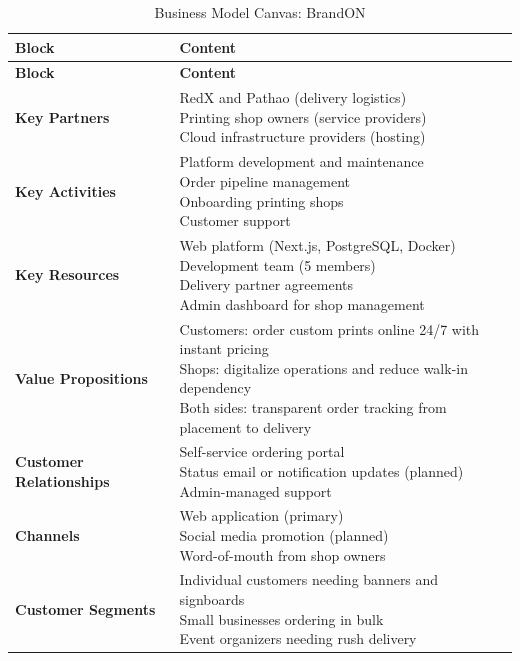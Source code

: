 \documentclass[12pt,a4paper]{report}
\makeatletter
\newcommand{\celllines}[1]{\begin{tabular}[t]{@{}l@{}}#1\end{tabular}}
\makeatother
\begin{document}
\begingroup
\footnotesize
\setlength{\LTleft}{0pt}
\setlength{\LTright}{0pt}
\setlength{\tabcolsep}{3pt}
\renewcommand{\arraystretch}{1.0}
\begin{xltabular}{\textwidth}{@{}L{3.2cm} X@{}}
  \caption{Business Model Canvas: BrandON}\\
  \toprule
  \textbf{Block} & \textbf{Content} \\
  \midrule
  \endfirsthead
  \toprule
  \textbf{Block} & \textbf{Content} \\
  \midrule
  \endhead
  \bottomrule
  \endfoot
  \textbf{Key Partners}
    & \celllines{RedX and Pathao (delivery logistics)\\Printing shop owners (service providers)\\Cloud infrastructure providers (hosting)} \\
  \midrule
  \textbf{Key Activities}
    & \celllines{Platform development and maintenance\\Order pipeline management\\Onboarding printing shops\\Customer support} \\
  \midrule
  \textbf{Key Resources}
    & \celllines{Web platform (Next.js, PostgreSQL, Docker)\\Development team (5 members)\\Delivery partner agreements\\Admin dashboard for shop management} \\
  \midrule
  \textbf{Value Propositions}
    & \celllines{Customers: order custom prints online 24/7 with instant pricing\\Shops: digitalize operations and reduce walk-in dependency\\Both sides: transparent order tracking from placement to delivery} \\
  \midrule
  \textbf{Customer Relationships}
    & \celllines{Self-service ordering portal\\Status email or notification updates (planned)\\Admin-managed support} \\
  \midrule
  \textbf{Channels}
    & \celllines{Web application (primary)\\Social media promotion (planned)\\Word-of-mouth from shop owners} \\
  \midrule
  \textbf{Customer Segments}
    & \celllines{Individual customers needing banners and signboards\\Small businesses ordering in bulk\\Event organizers needing rush delivery} \\

\end{xltabular}
\end{document}
